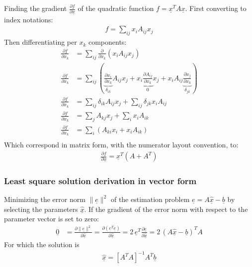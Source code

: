 Finding the gradient $\frac{\partial f}{\partial \underline{x}}$ of the quadratic function $f=\underline{x}^T A \underline{x}$. First converting to index notations:
\begin{align}
 f = \sum_{ij}{x_i A_{ij} x_j}
\end{align}
Then differentiating per $x_k$ components:
\begin{align}
 \frac{\partial f}{\partial x_k} &= \sum_{ij}{  \frac{\partial}{\partial x_k} \left(x_i A_{ij} x_j \right)} \\
 \frac{\partial f}{\partial x_k} &= \sum_{ij}{\left( \underbrace{ \frac{\partial x_i}{\partial x_k}}_{\delta_{ik}}  A_{ij} x_j + x_i \underbrace{\frac{\partial A_{ij} }{\partial x_k}}_{0} x_j + x_i A_{ij} \underbrace{\frac{\partial x_j}{\partial x_k}}_{\delta_{jk}} \right)} \\
 \frac{\partial f}{\partial x_k} &= \sum_{ij}{  \delta_{ik}  A_{ij} x_j } + \sum_{ij}{  \delta_{jk} x_i A_{ij} }\\
 \frac{\partial f}{\partial x_k} &= \sum_{j}{  A_{kj} x_j } + \sum_{i}{ x_i A_{ik} }\\
 \frac{\partial f}{\partial x_k} &= \sum_{i}{\left(  A_{ki} x_i  + x_i A_{ik} \right)}\\
\end{align}
Which correspond in matrix form, with the numerator layout convention, to:
\begin{align}
 \frac{\partial f}{\partial \underline{x}} = \underline{x}^T ( A + A^T )
\end{align}

\subsubsection{Least square solution derivation in vector form}

Minimizing the error norm $\|\underline{e}\|^2$ of the estimation problem $\underline{e} = A \underline{\hat{x}} - \underline{b}$ by selecting the parameters $\underline{\hat{x}}$. If the gradient of the error norm with respect to the parameter vector is set to zero:
\begin{align}
 \underline{0} &= \frac{\partial \|\underline{e}\|^2 }{\partial \underline{\hat{x}}} = \frac{\partial (\underline{e}^T \underline{e} )}{\partial \underline{\hat{x}}} = 2 \, \underline{e}^T \frac{\partial \underline{e} }{\partial \underline{\hat{x}}} = 2\, (A \underline{\hat{x}} - \underline{b})^T A
\end{align}
For which the solution is
\begin{align}
 \underline{\hat{x}} = \left[ A^T A \right]^{-1} A^T \underline{b}
\end{align}
